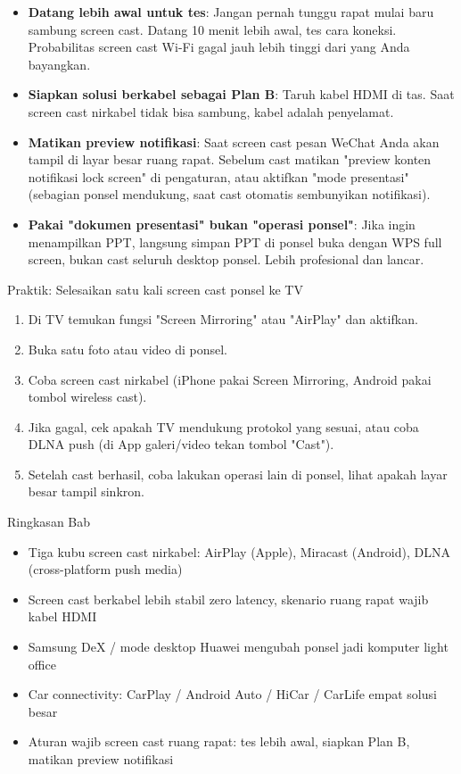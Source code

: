 \begin{itemize}
  \item \textbf{Datang lebih awal untuk tes}: Jangan pernah tunggu rapat mulai baru sambung screen cast. Datang 10 menit lebih awal, tes cara koneksi. Probabilitas screen cast Wi-Fi gagal jauh lebih tinggi dari yang Anda bayangkan.
  \item \textbf{Siapkan solusi berkabel sebagai Plan B}: Taruh kabel HDMI di tas. Saat screen cast nirkabel tidak bisa sambung, kabel adalah penyelamat.
  \item \textbf{Matikan preview notifikasi}: Saat screen cast pesan WeChat Anda akan tampil di layar besar ruang rapat. Sebelum cast matikan "preview konten notifikasi lock screen" di pengaturan, atau aktifkan "mode presentasi" (sebagian ponsel mendukung, saat cast otomatis sembunyikan notifikasi).
  \item \textbf{Pakai "dokumen presentasi" bukan "operasi ponsel"}: Jika ingin menampilkan PPT, langsung simpan PPT di ponsel buka dengan WPS full screen, bukan cast seluruh desktop ponsel. Lebih profesional dan lancar.
\end{itemize}

\begin{tcbpractice}{Praktik: Selesaikan satu kali screen cast ponsel ke TV}
\begin{enumerate}
  \item Di TV temukan fungsi "Screen Mirroring" atau "AirPlay" dan aktifkan.
  \item Buka satu foto atau video di ponsel.
  \item Coba screen cast nirkabel (iPhone pakai Screen Mirroring, Android pakai tombol wireless cast).
  \item Jika gagal, cek apakah TV mendukung protokol yang sesuai, atau coba DLNA push (di App galeri/video tekan tombol "Cast").
  \item Setelah cast berhasil, coba lakukan operasi lain di ponsel, lihat apakah layar besar tampil sinkron.
\end{enumerate}

\end{tcbpractice}

\begin{tcbsummary}{Ringkasan Bab}
\begin{itemize}
  \item Tiga kubu screen cast nirkabel: AirPlay (Apple), Miracast (Android), DLNA (cross-platform push media)
  \item Screen cast berkabel lebih stabil zero latency, skenario ruang rapat wajib kabel HDMI
  \item Samsung DeX / mode desktop Huawei mengubah ponsel jadi komputer light office
  \item Car connectivity: CarPlay / Android Auto / HiCar / CarLife empat solusi besar
  \item Aturan wajib screen cast ruang rapat: tes lebih awal, siapkan Plan B, matikan preview notifikasi
\end{itemize}

\end{tcbsummary}
